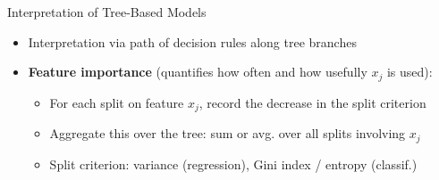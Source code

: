 \documentclass[10pt,compress,t,notes=noshow, xcolor=table]{beamer}
\begin{document}
\begin{frame}{Interpretation of Tree-Based Models}
\begin{itemize}
    \item Interpretation via path of decision rules along tree branches
    \item \textbf{Feature importance} (quantifies how often and how usefully $x_j$ is used): 
    \begin{itemize}
        \item For each split on feature $x_j$, record the decrease in the split criterion 
        \item Aggregate this over the tree: sum or avg. over all splits involving $x_j$
        \item Split criterion: variance (regression), Gini index / entropy (classif.)
    \end{itemize}
\end{itemize}
\begin{columns}[T, totalwidth=\textwidth]
  \begin{column}{0.6\textwidth}




\end{column}
\end{columns}
\end{frame}
\end{document}
